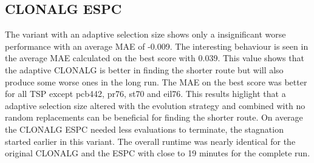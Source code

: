 \subsection{CLONALG ESPC}
The variant with an adaptive selection size shows only a insignificant worse performance with an average MAE of -0.009. The interesting behaviour is seen in the average MAE calculated on the best score with 0.039. This value shows that the adaptive CLONALG is better in finding the shorter route but will also produce some worse ones in the long run. The MAE on the best score was better for all TSP except pcb442, pr76, st70 and eil76. This results higlight that a adaptive selection size altered with the evolution strategy and combined with no random replacements can be beneficial for finding the shorter route. On average the CLONALG ESPC needed less evaluations to terminate, the stagnation started earlier in this variant. The overall runtime was nearly identical for the original CLONALG and the ESPC with close to 19 minutes for the complete run.
